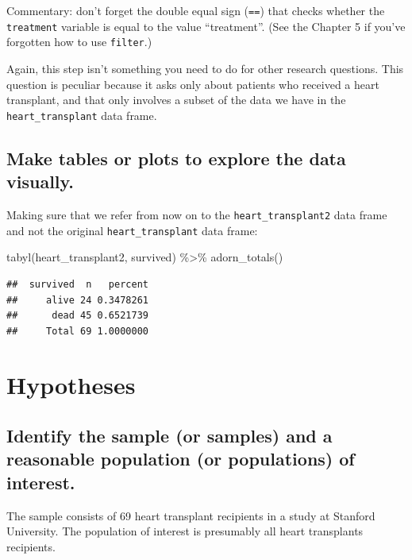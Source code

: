 \documentclass[
]{book}
\newenvironment{Shaded}{\begin{snugshade}}{\end{snugshade}}
\newcommand{\FunctionTok}[1]{\textcolor[rgb]{0.00,0.00,0.00}{#1}}
\newcommand{\NormalTok}[1]{#1}
\newcommand{\SpecialCharTok}[1]{\textcolor[rgb]{0.00,0.00,0.00}{#1}}
\begin{document}
Commentary: don't forget the double equal sign (\texttt{==}) that checks whether the \texttt{treatment} variable is equal to the value ``treatment''. (See the Chapter 5 if you've forgotten how to use \texttt{filter}.)

Again, this step isn't something you need to do for other research questions. This question is peculiar because it asks only about patients who received a heart transplant, and that only involves a subset of the data we have in the \texttt{heart\_transplant} data frame.

\hypertarget{one-prop-ex-plots}{%
\subsection{Make tables or plots to explore the data visually.}\label{one-prop-ex-plots}}

Making sure that we refer from now on to the \texttt{heart\_transplant2} data frame and not the original \texttt{heart\_transplant} data frame:

\begin{Shaded}
\begin{Highlighting}[]
\FunctionTok{tabyl}\NormalTok{(heart\_transplant2, survived) }\SpecialCharTok{\%\textgreater{}\%}
    \FunctionTok{adorn\_totals}\NormalTok{()}
\end{Highlighting}
\end{Shaded}

\begin{verbatim}
##  survived  n   percent
##     alive 24 0.3478261
##      dead 45 0.6521739
##     Total 69 1.0000000
\end{verbatim}

\hypertarget{one-prop-ex-hypotheses}{%
\section{Hypotheses}\label{one-prop-ex-hypotheses}}

\hypertarget{one-prop-ex-sample-pop}{%
\subsection{Identify the sample (or samples) and a reasonable population (or populations) of interest.}\label{one-prop-ex-sample-pop}}

The sample consists of 69 heart transplant recipients in a study at Stanford University. The population of interest is presumably all heart transplants recipients.
\end{document}
